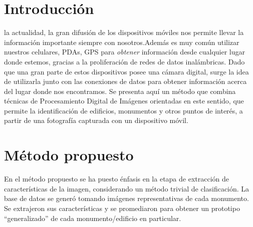 \documentclass[conference,spanish,a4paper,10pt,oneside,final]{tfmpd}
\begin{document}
\section{Introducción}
%
%
%
 la actualidad, la gran difusión de los dispositivos móviles nos
permite llevar la información importante siempre con nosotros.Además es muy 
común utilizar nuestros celulares, PDAs, GPS para \emph{obtener}
información desde cualquier lugar donde estemos, gracias a la proliferación de redes de datos
inalámbricas. Dado que una gran parte de estos dispositivos %
posee%
una cámara
digital, surge la idea de utilizarla junto con las conexiones de datos para
obtener información acerca del lugar donde nos encontramos. Se presenta aquí %
un método que combina
técnicas de Procesamiento Digital de Imágenes orientadas
en este sentido, que permite la
identificación de edificios, monumentos y otros puntos de interés, a partir
de una fotografía capturada con un dispositivo móvil.
%
%
%
%
\section{Método propuesto}
En el método propuesto se ha puesto énfasis en la etapa de 
extracción de características de la imagen, considerando
un método trivial de clasificación. %
La base de datos se generó tomando  imágenes representativas 
de %
cada monumento. %
Se extrajeron sus características y se promediaron %
para obtener un prototipo ``generalizado'' de cada monumento/edificio 
en particular.
\end{document}
